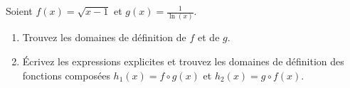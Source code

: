 
\begin{exercice}\label{exoDS2010-1-0001}

Soient $f(x)= \sqrt{x-1}$ et $\displaystyle g(x)=\frac{1}{\ln(x)}$. 

\begin{enumerate}
\item Trouvez les domaines de définition de $f$ et de $g$.
\item Écrivez les expressions explicites et trouvez les domaines de définition des fonctions composées $h_1 (x) = f\circ g (x)$ et $h_2(x)=g\circ f (x)$.
\end{enumerate}
 

\end{exercice}
